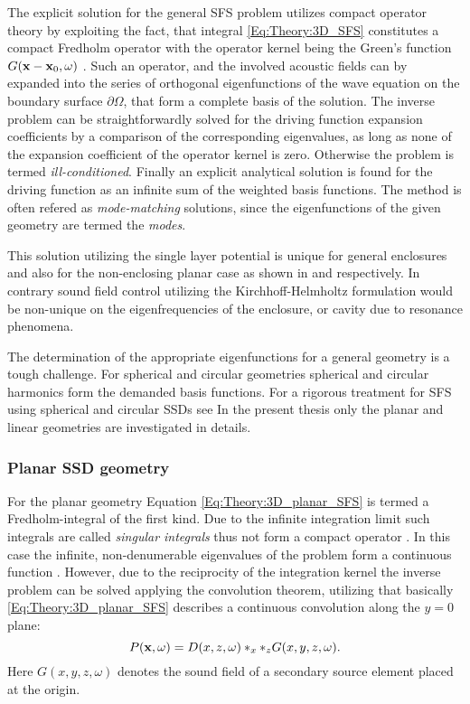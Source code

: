 The explicit solution for the general SFS problem utilizes compact operator theory by exploiting the fact, that integral \ref{Eq:Theory:3D_SFS} constitutes a compact Fredholm operator with the operator kernel being the Green's function $G(\mathbf{x} - \mathbf{x}_0 , \omega )$ \cite{Ahrens2012,MorseFeshbach1953}.
Such an operator, and the involved acoustic fields can by expanded into the series of orthogonal eigenfunctions of the wave equation on the boundary surface $\partial \Omega$, that form a complete basis of the solution. The inverse problem can be straightforwardly solved for the driving function expansion coefficients by a comparison of the corresponding eigenvalues, as long as none of the expansion coefficient of the operator kernel is zero. Otherwise the problem is termed \emph{ill-conditioned}. 
Finally an explicit analytical solution is found for the driving function as an infinite sum of the weighted basis functions.
The method is often refered as \emph{mode-matching} solutions, since the eigenfunctions of the given geometry are termed the \emph{modes}.

This solution utilizing the single layer potential is unique for general enclosures and also for the non-enclosing planar case as shown in \cite{Zotter2013:uniqueness} and \cite{Fazi2010} respectively. In contrary sound field control utilizing the Kirchhoff-Helmholtz formulation would be non-unique on the eigenfrequencies of the enclosure, or cavity due to resonance phenomena.

The determination of the appropriate eigenfunctions for a general geometry is a tough challenge.
For spherical and circular geometries spherical and circular harmonics form the demanded basis functions. For a rigorous treatment for SFS using spherical and circular SSDs see \cite{Ahrens2010phd,Zotter2009phd,Ahrens2012,Ahrens2009:circularSSD_mismatch,Ahrens2009:circular25D_SFR,Ahrens2008:Analytical_Circ_Spherical_SFS}
In the present thesis only the planar and linear geometries are investigated in details.

\subsubsection{Planar SSD geometry}

For the planar geometry Equation \eqref{Eq:Theory:3D_planar_SFS} is termed a Fredholm-integral of the first kind. Due to the infinite integration limit such integrals are called \emph{singular integrals} thus not form a compact operator \cite[p.~921.]{MorseFeshbach1953}. 
In this case the infinite, non-denumerable eigenvalues of the problem form a continuous function \cite{MorseFeshbach1953,Schultz2014:Comparing_approaches}.
However, due to the reciprocity of the integration kernel the inverse problem can be solved applying the convolution theorem, utilizing that basically \eqref{Eq:Theory:3D_planar_SFS} describes a continuous convolution along the $y=0$ plane:
\begin{equation}
P(\mathbf{x},\omega) = D(x,z,\omega)\ast_{x} \ast_{z} G(x,y,z,\omega).
\end{equation}
Here $G(x,y,z,\omega)$ denotes the sound field of a secondary source element placed at the origin.


